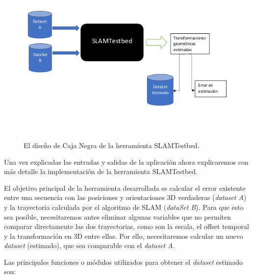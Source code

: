 \begin{figure}[H]
\begin{center}
\label{fig:Open File}\includegraphics[height=8.0cm,width=14.0cm]{img/cap5/Esquema_TFM_CajaNegra2.png}
\hspace{0.5cm}
\end{center}
\caption{ El diseño de Caja Negra de la herramienta SLAMTestbed. }
\end{figure}

Una vez explicadas las entradas y salidas de la aplicación ahora explicaremos
con más detalle la implementación de la herramienta SLAMTestbed. 

El objetivo principal de la herramienta desarrollada es calcular el error existente entre una secuencia con las posiciones y orientaciones 3D verdaderas (\textit{dataset A}) y la trayectoria calculada por el algoritmo de SLAM (\textit{dataSet B}). Para que esto sea posible, necesitaremos antes eliminar algunas variables que no permiten comparar directamente las dos trayectorias, como son la escala, el offset temporal y la transformación en 3D entre ellas. Por ello, necesitaremos calcular un nuevo \textit{dataset} (estimado), que sea comparable con el \textit{dataset A}. 

Las principales funciones o módulos utilizados para obtener el \textit{dataset} estimado son:

